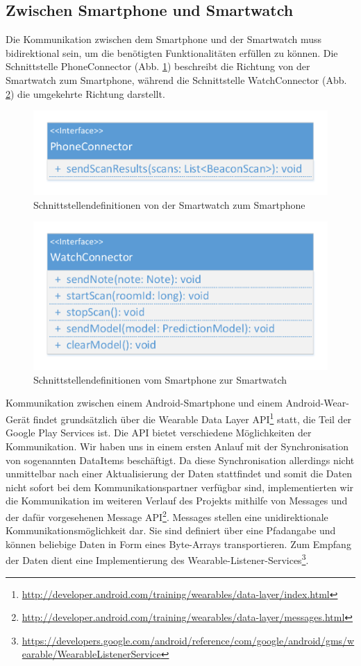 \subsection{Zwischen Smartphone und Smartwatch}
Die Kommunikation zwischen dem Smartphone und der Smartwatch muss bidirektional sein, um die benötigten Funktionalitäten erfüllen zu können. Die Schnittstelle PhoneConnector (Abb. \ref{fig:KlassendiagrammePhone}) beschreibt die Richtung von der Smartwatch zum Smartphone, während die Schnittstelle WatchConnector (Abb. \ref{fig:KlassendiagrammeWatch}) die umgekehrte Richtung darstellt.

\begin{figure}[H]
\centering
\includegraphics[width=0.5\linewidth]{../Bilder/KlassendiagrammePhone}
\caption{Schnittstellendefinitionen von der Smartwatch zum Smartphone}
\label{fig:KlassendiagrammePhone}
\end{figure}

\begin{figure}[H]
\centering
\includegraphics[width=0.5\linewidth]{../Bilder/KlassendiagrammeWatch}
\caption{Schnittstellendefinitionen vom Smartphone zur Smartwatch}
\label{fig:KlassendiagrammeWatch}
\end{figure}

Kommunikation zwischen einem Android-Smartphone und einem Android-Wear-Gerät findet grundsätzlich über die Wearable Data Layer API\footnote{\url{http://developer.android.com/training/wearables/data-layer/index.html}} statt, die Teil der Google Play Services ist. Die API bietet verschiedene Möglichkeiten der Kommunikation. Wir haben uns in einem ersten Anlauf mit der Synchronisation von sogenannten DataItems beschäftigt. Da diese Synchronisation allerdings nicht unmittelbar nach einer Aktualisierung der Daten stattfindet und somit die Daten nicht sofort bei dem Kommunikationspartner verfügbar sind, implementierten wir die Kommunikation im weiteren Verlauf des Projekts mithilfe von Messages und der dafür vorgesehenen
Message API\footnote{\url{http://developer.android.com/training/wearables/data-layer/messages.html}}.
Messages stellen eine unidirektionale Kommunikationsmöglichkeit dar. Sie sind definiert über eine Pfadangabe und können beliebige Daten in Form eines Byte-Arrays transportieren. Zum Empfang der Daten dient eine Implementierung des
Wearable-Listener-Services\footnote{\url{https://developers.google.com/android/reference/com/google/android/gms/wearable/WearableListenerService}}.

